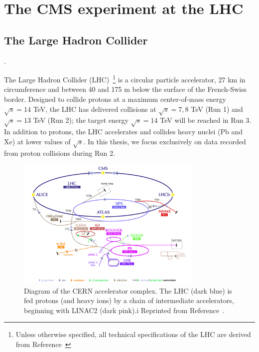 \chapter{The CMS experiment at the LHC}
\label{sec:cms}

\section{The Large Hadron Collider}
\label{sec:cms:lhc}.

The Large Hadron Collider (LHC)~\cite{lhcjinst}\footnote{Unless otherwise specified, all technical specifications of the LHC are derived from Reference~\cite{lhcjinst}} is a circular particle accelerator, 27 km in circumference and between 40 and 175 m below the surface of the French-Swiss border. 
Designed to collide protons at a maximum center-of-mass energy $\sqrt{s} = 14$ TeV, the LHC has delivered collisions at $\sqrt{s}=7,8$ TeV (Run 1) and $\sqrt{s} = 13$ TeV (Run 2); the target energy $\sqrt{s} = 14$ TeV will be reached in Run 3. 
In addition to protons, the LHC accelerates and collides heavy nuclei (Pb and Xe) at lower values of $\sqrt{s}$. 
In this thesis, we focus exclusively on data recorded from proton collisions during Run 2. 

\begin{figure}[][]
    \begin{center}
        \includegraphics[width=0.8\textwidth]{figures/cms/lhc.png}
        \caption{Diagram of the CERN accelerator complex.
                 The LHC (dark blue) is fed protons (and heavy ions) by a chain of intermediate accelerators, beginning with LINAC2 (dark pink).i
                 Reprinted from Reference~\cite{lhcpic}. 
                    }
        \label{fig:cms:lhc}
    \end{center}
\end{figure}

